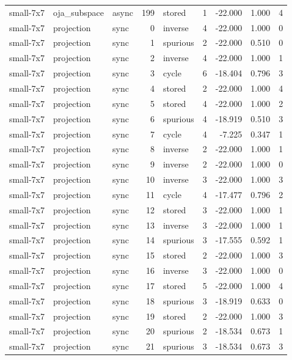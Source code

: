 \begin{tabular}{lllrlrrrr}
small-7x7 & oja\_subspace & async & 199 & stored & 1 & -22.000 & 1.000 & 4 \\
small-7x7 & projection & sync & 0 & inverse & 4 & -22.000 & 1.000 & 0 \\
small-7x7 & projection & sync & 1 & spurious & 2 & -22.000 & 0.510 & 0 \\
small-7x7 & projection & sync & 2 & inverse & 4 & -22.000 & 1.000 & 1 \\
small-7x7 & projection & sync & 3 & cycle & 6 & -18.404 & 0.796 & 3 \\
small-7x7 & projection & sync & 4 & stored & 2 & -22.000 & 1.000 & 4 \\
small-7x7 & projection & sync & 5 & stored & 4 & -22.000 & 1.000 & 2 \\
small-7x7 & projection & sync & 6 & spurious & 4 & -18.919 & 0.510 & 3 \\
small-7x7 & projection & sync & 7 & cycle & 4 & -7.225 & 0.347 & 1 \\
small-7x7 & projection & sync & 8 & inverse & 2 & -22.000 & 1.000 & 1 \\
small-7x7 & projection & sync & 9 & inverse & 2 & -22.000 & 1.000 & 0 \\
small-7x7 & projection & sync & 10 & inverse & 3 & -22.000 & 1.000 & 3 \\
small-7x7 & projection & sync & 11 & cycle & 4 & -17.477 & 0.796 & 2 \\
small-7x7 & projection & sync & 12 & stored & 3 & -22.000 & 1.000 & 1 \\
small-7x7 & projection & sync & 13 & inverse & 3 & -22.000 & 1.000 & 1 \\
small-7x7 & projection & sync & 14 & spurious & 3 & -17.555 & 0.592 & 1 \\
small-7x7 & projection & sync & 15 & stored & 2 & -22.000 & 1.000 & 3 \\
small-7x7 & projection & sync & 16 & inverse & 3 & -22.000 & 1.000 & 0 \\
small-7x7 & projection & sync & 17 & stored & 5 & -22.000 & 1.000 & 4 \\
small-7x7 & projection & sync & 18 & spurious & 3 & -18.919 & 0.633 & 0 \\
small-7x7 & projection & sync & 19 & stored & 2 & -22.000 & 1.000 & 3 \\
small-7x7 & projection & sync & 20 & spurious & 2 & -18.534 & 0.673 & 1 \\
small-7x7 & projection & sync & 21 & spurious & 3 & -18.534 & 0.673 & 3 \\

\end{tabular}
